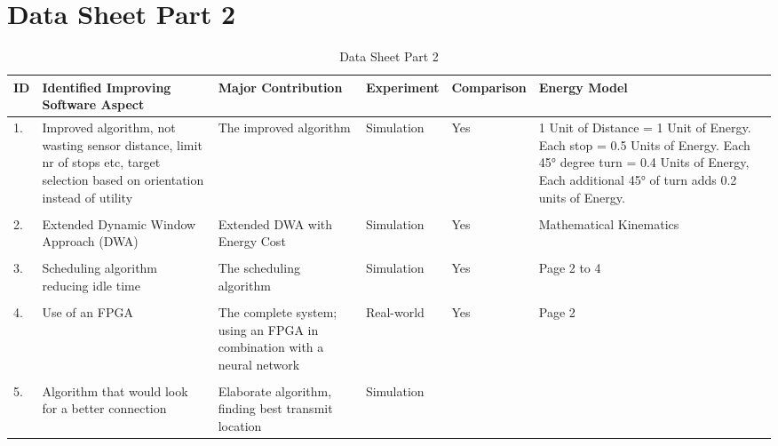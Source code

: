 \section{Data Sheet Part 2}
\label{appendix:data_sheet_2}

\begin{table}[h]
    \centering
    \caption{Data Sheet Part 2}
    \begin{tabular}{p{0.1cm}p{5cm}p{3cm}p{2cm}p{2cm}p{4cm}p{5cm}}
        \toprule
            {ID} &
                {Identified Improving Software Aspect}    &
                {Major Contribution} &
                {Experiment}         &
                {Comparison}         &
                {Energy Model}       \\
        \midrule
            {1.} &
                {Improved algorithm, not wasting sensor distance, limit nr of stops etc, 
                target selection based on orientation instead of utility} &
                {The improved algorithm} &
                {Simulation} &
                {Yes} &
                {1 Unit of Distance = 1 Unit of Energy.
                Each stop = 0.5 Units of Energy.
                Each 45° degree turn = 0.4 Units of Energy,
                Each additional 45° of turn adds 0.2 units of Energy.} \\
            \hline
            \\
            {2.} &
                {Extended Dynamic Window Approach (DWA)} & 
                {Extended DWA with Energy Cost} &
                {Simulation} &
                {Yes} &
                {Mathematical Kinematics} \\
            \hline
            \\
            {3.} &
                {Scheduling algorithm reducing idle time} &
                {The scheduling algorithm} &
                {Simulation} &
                {Yes} &
                {Page 2 to 4} \\
            \hline
            \\
            {4.} &
                {Use of an FPGA} &
                {The complete system; using an FPGA in combination with a neural network} &
                {Real-world} &
                {Yes} &
                {Page 2} \\
            \hline
            \\
            {5.} &
                {Algorithm that would look for a better connection} &
                {Elaborate algorithm, finding best transmit location} &
                {Simulation} &

\end{tabular}
\end{table}
